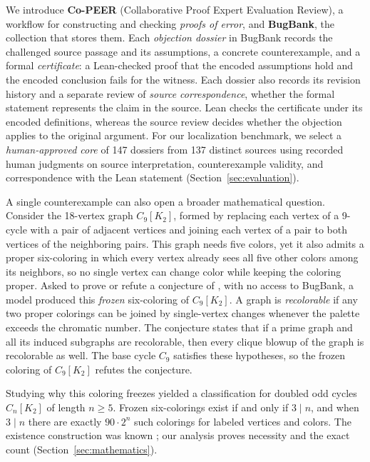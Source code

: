 We introduce \textbf{Co-PEER} (Collaborative Proof Expert Evaluation Review), a workflow for constructing and checking \emph{proofs of error}, and \textbf{BugBank}, the collection that stores them. Each \emph{objection dossier} in BugBank records the challenged source passage and its assumptions, a concrete counterexample, and a formal \emph{certificate}: a Lean-checked proof that the encoded assumptions hold and the encoded conclusion fails for the witness. Each dossier also records its revision history and a separate review of \emph{source correspondence}, whether the formal statement represents the claim in the source. Lean checks the certificate under its encoded definitions, whereas the source review decides whether the objection applies to the original argument. For our localization benchmark, we select a \emph{human-approved core} of 147 dossiers from 137 distinct sources using recorded human judgments on source interpretation, counterexample validity, and correspondence with the Lean statement (Section~\ref{sec:evaluation}).

A single counterexample can also open a broader mathematical question. Consider the 18-vertex graph $C_9[K_2]$, formed by replacing each vertex of a 9-cycle with a pair of adjacent vertices and joining each vertex of a pair to both vertices of the neighboring pairs. This graph needs five colors, yet it also admits a proper six-coloring in which every vertex already sees all five other colors among its neighbors, so no single vertex can change color while keeping the coloring proper. Asked to prove or refute a conjecture of \citet{belavadi2026recoloring}, with no access to BugBank, a model produced this \emph{frozen} six-coloring of $C_9[K_2]$. A graph is \emph{recolorable} if any two proper colorings can be joined by single-vertex changes whenever the palette exceeds the chromatic number. The conjecture states that if a prime graph and all its induced subgraphs are recolorable, then every clique blowup of the graph is recolorable as well. The base cycle $C_9$ satisfies these hypotheses, so the frozen coloring of $C_9[K_2]$ refutes the conjecture.

Studying why this coloring freezes yielded a classification for doubled odd cycles $C_n[K_2]$ of length $n\ge5$. Frozen six-colorings exist if and only if $3\mid n$, and when $3\mid n$ there are exactly $90\cdot2^n$ such colorings for labeled vertices and colors. The existence construction was known \citep{shaebani2009fall}; our analysis proves necessity and the exact count (Section~\ref{sec:mathematics}).

